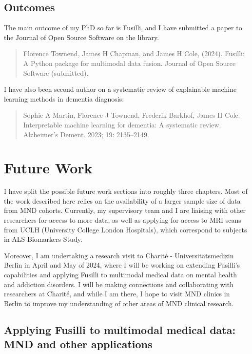 \subsection{Outcomes}

The main outcome of my PhD so far is Fusilli, and I have submitted a paper to the Journal of Open Source Software on the library.

\begin{quote}
Florence Townend, James H Chapman, and James H Cole, (2024). Fusilli: A Python package for multimodal data fusion. Journal of Open Source Software (submitted).
\end{quote}

I have also been second author on a systematic review of explainable machine learning methods in dementia diagnosis:

\begin{quote}
    Sophie A Martin, Florence J Townend, Frederik Barkhof, James H Cole. Interpretable machine learning for dementia: A systematic review. Alzheimer's Dement. 2023; 19: 2135–2149.~\cite{martinInterpretableMachineLearning2023}
\end{quote}

\section{Future Work}

I have split the possible future work sections into roughly three chapters.
Most of the work described here relies on the availability of a larger sample size of data from MND cohorts.
Currently, my supervisory team and I are liaising with other researchers for access to more data, as well as applying for access to MRI scans from UCLH (University College London Hospitals), which correspond to subjects in ALS Biomarkers Study.

Moreover, I am undertaking a research visit to Charité - Universitätsmedizin Berlin in April and May of 2024, where I will be working on extending Fusilli's capabilities and applying Fusilli to multimodal medical data on mental health and addiction disorders.
I will be making connections and collaborating with researchers at Charité, and while I am there, I hope to visit MND clinics in Berlin to improve my understanding of other areas of MND clinical research.

\subsection{Applying Fusilli to multimodal medical data: MND and other applications}

